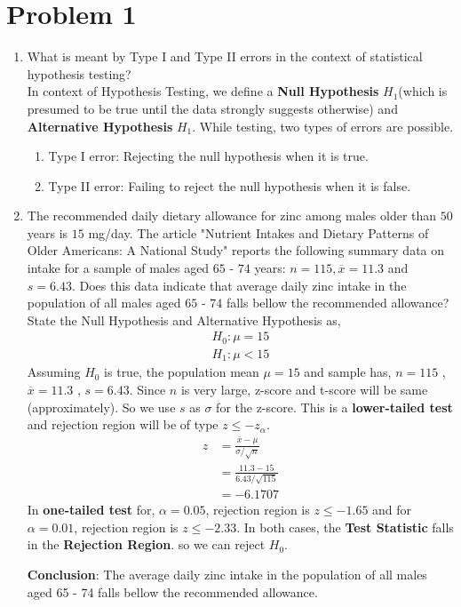 \section*{Problem 1}
\noindent 



\begin{enumerate}[label=\alph*)]
\item 
\noindent What is meant by Type I and Type II errors in the context of statistical hypothesis testing?\\
\newline
In context of Hypothesis Testing, we define a \textbf{Null Hypothesis} $H_1$(which is presumed to be true until the data strongly suggests otherwise) and \textbf{Alternative Hypothesis} $H_1$. While testing, two types of errors are possible.
\begin{enumerate}[label=\arabic*)]
\item Type I error: Rejecting the null hypothesis when it is true. 
\item Type II error: Failing to reject the null hypothesis when it is false. 
  
\end{enumerate}



\item 
The recommended daily dietary allowance for zinc among males older than $50$ years is $15$ mg/day. The article "Nutrient Intakes and Dietary Patterns of Older Americans: A National Study" reports the following summary data on intake for a sample of males aged $65$ - $74$ years: $n = 115, \overline{x} = 11.3$ and $s = 6.43$. Does this data indicate that average daily zinc intake in the population of all males aged $65$ - $74$ falls bellow the recommended allowance?\\
\newline
State the Null Hypothesis and Alternative Hypothesis as,
\begin{align*}
H_0: \mu = 15\\
H_1: \mu < 15
\end{align*}
Assuming $H_0$ is true, the population mean $\mu = 15$ and sample has, $n = 115$ , $\overline{x} = 11.3$ , $s = 6.43$. Since $n$ is very large, z-score and t-score will be same (approximately). So we use $s$ as $\sigma$ for the z-score. This is a \textbf{lower-tailed test} and rejection region will be of type $z \leq -z_{\alpha}$.
\begin{align*}
z &= \frac{\bar{x}- \mu}{\sigma/\sqrt{n}}\\
&= \frac{11.3 - 15}{6.43 / \sqrt{115}}\\
&= -6.1707
\end{align*}
In \textbf{one-tailed test} for, $\alpha = 0.05$,  rejection region is $z \leq  -1.65$ and for $\alpha = 0.01$, rejection region is $z \leq -2.33$. In both cases, the \textbf{Test Statistic} falls in the \textbf{Rejection Region}. so we can reject $H_0$.

\textbf{Conclusion}: The average daily zinc intake in the population of all males aged 65 - 74 falls bellow the recommended allowance.





\end{enumerate}